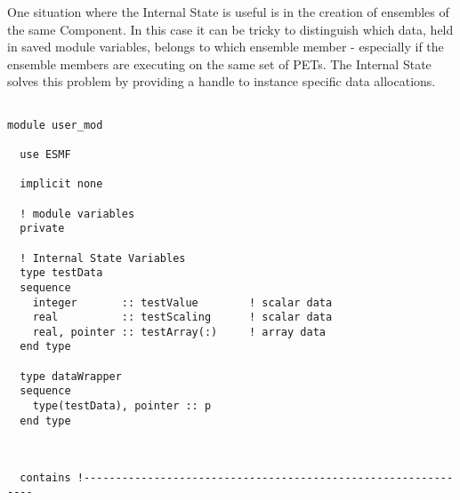      One situation where the Internal State is useful is in the
     creation of ensembles of the same Component. In this case it can 
     be tricky to distinguish which data, held in saved module variables, 
     belongs to which ensemble member - especially if the ensemble members
     are executing on the same set of PETs. The Internal State solves this
     problem by providing a handle to instance specific data allocations.
   

 \begin{verbatim}

module user_mod

  use ESMF

  implicit none
  
  ! module variables
  private

  ! Internal State Variables
  type testData
  sequence
    integer       :: testValue        ! scalar data
    real          :: testScaling      ! scalar data
    real, pointer :: testArray(:)     ! array data
  end type

  type dataWrapper
  sequence
    type(testData), pointer :: p
  end type

 
\end{verbatim}
 

 \begin{verbatim}
  contains !--------------------------------------------------------------
 
\end{verbatim}
 

